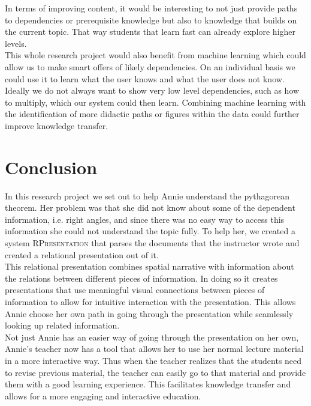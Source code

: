 \documentclass[twoside, 12pt]{article}
\newcommand{\sys}{\textsc{RPresentation}\xspace}
\begin{document}
In terms of improving content, it would be interesting to not just provide paths to dependencies or prerequisite knowledge but also to knowledge that builds on the current topic. That way students that learn fast can already explore higher levels.\\

This whole research project would also benefit from machine learning which could allow us to make smart offers of likely dependencies. On an individual basis we could use it to learn what the user knows and what the user does not know. Ideally we do not always want to show very low level dependencies, such as how to multiply, which our system could then learn. Combining machine learning with the identification of more didactic paths or figures within the data could further improve knowledge transfer.

\section{Conclusion}
\label{sec:conclusion}

In this research project we set out to help Annie understand the pythagorean theorem. Her problem was that she did not know about some of the dependent information, i.e. right angles, and since there was no easy way to access this information she could not understand the topic fully. To help her, we created a system \sys that parses the documents that the instructor wrote and created a relational presentation out of it.\\

This relational presentation combines spatial narrative with information about the relations between different pieces of information. In doing so it creates presentations that use meaningful visual connections between pieces of information to allow for intuitive interaction with the presentation. This allows Annie choose her own path in going through the presentation while seamlessly looking up related information.\\

Not just Annie has an easier way of going through the presentation on her own, Annie's teacher now has a tool that allows her to use her normal lecture material in a more interactive way. Thus when the teacher realizes that the students need to revise previous material, the teacher can easily go to that material and provide them with a good learning experience. This facilitates knowledge transfer and allows for a more engaging and interactive education.\\
\end{document}
